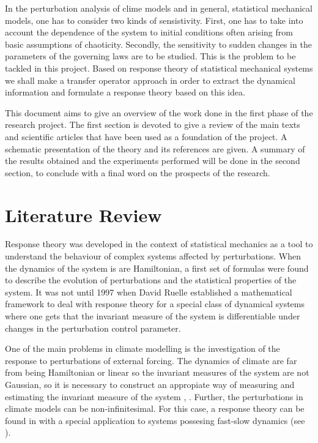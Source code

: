 
\noindent In the perturbation analysis of clime models and in general, statistical mechanical models, one has to consider two kinds of sensistivity. First, one has to take into account the dependence of the system to initial conditions often arising from basic assumptions of chaoticity. Secondly, the sensitivity to sudden changes in the parameters of the governing laws are to be studied. This is the problem to be tackled in this project. Based on response theory of statistical mechanical systems we shall make a transfer operator approach in order to extract the dynamical information and formulate a response theory based on this idea.

This document aims to give an overview of the work done in the first phase of the research project. The first section is devoted to give a review of the main texts and scientific articles that have been used as a foundation of the project. A schematic presentation of the theory and its references are given. A summary of the results obtained and the experiments performed will be done in the second section, to conclude with a final word on the prospects of the research.


\section*{Literature Review}

Response theory was developed in the context of statistical mechanics as a tool to understand the behaviour of complex systems affected by perturbations. When the dynamics of the system is are Hamiltonian, a first set of formulas were found \cite{kubo} to describe the evolution of perturbations and the statistical properties of the system. It was not until 1997 when David Ruelle \cite{ruelle} established a mathematical framework to deal with response theory for a special class of dynamical systems where one gets that the invariant measure of the system is differentiable under changes in the perturbation control parameter.

One of the main problems in climate modelling is the investigation of the response to perturbations of external forcing. The dynamics of climate are far from being Hamiltonian or linear so the invariant measures of the system are not Gaussian, so it is necessary to construct an appropiate way of measuring and estimating the invariant measure of the system \cite{leith}, \cite{review}. Further, the perturbations in climate models can be non-infinitesimal. For this case, a response theory can be found in \cite{vulpiani} with a special application to systems possesing fast-slow dynamics (see \cite{lacorata}).

